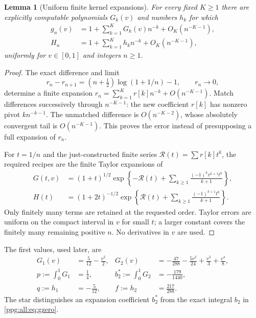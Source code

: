 \documentclass[11pt,letterpaper]{article}
\newtheorem{lemma}[theorem]{Lemma}
\theoremstyle{remark}\newtheorem{remark}[theorem]{Remark}
\numberwithin{equation}{section}
\begin{document}
\begin{lemma}[Uniform finite kernel expansions]\label{ppg:all:lem:kernel}
For every fixed $K\ge1$ there are explicitly computable polynomials $G_k(v)$ and numbers $h_k$ for which
\begin{align}
 g_n(v)&=1+\sum_{k=1}^K G_k(v)n^{-k}+O_K(n^{-K-1}),\label{ppg:all:eq:gexp}\\
 H_n&=1+\sum_{k=1}^K h_kn^{-k}+O_K(n^{-K-1}),\label{ppg:all:eq:Hexp}
\end{align}
uniformly for $v\in[0,1]$ and integers $n\ge1$.
\end{lemma}
\begin{proof}
The exact difference and limit
\[
 r_n-r_{n+1}=(n+\tfrac12)\log(1+1/n)-1,\qquad r_n\to0,
\]
determine a finite expansion $r_n=\sum_{k=1}^K r[k]n^{-k}+O(n^{-K-1})$. Match differences successively through $n^{-K-1}$: the new coefficient $r[k]$ has nonzero pivot $k n^{-k-1}$. The unmatched difference is $O(n^{-K-2})$, whose absolutely convergent tail is $O(n^{-K-1})$. This proves the error instead of presupposing a full expansion of $r_n$.

For $t=1/n$ and the just-constructed finite series $\mathcal R(t)=\sum r[k]t^k$, the required recipes are the finite Taylor expansions of
\begin{align}
 G(t,v)&=(1+t)^{1/2}\exp\left\{-\mathcal R(t)
        +\sum_{k\ge1}\frac{(-1)^kv^{k+1}t^k}{k+1}\right\},\label{ppg:all:eq:Grecipe}\\
 H(t)&=(1+2t)^{-1/2}\exp\left\{\mathcal R(t)
        +\sum_{k\ge1}\frac{(-1)^{k+1}t^k}{k+1}\right\}.\label{ppg:all:eq:Hrecipe}
\end{align}
Only finitely many terms are retained at the requested order. Taylor errors are uniform on the compact interval in $v$ for small $t$; a larger constant covers the finitely many remaining positive $n$. No derivatives in $v$ are used.
\end{proof}
The first values, used later, are
\begin{align}
 G_1(v)&=\frac5{12}-\frac{v^2}2,
 &G_2(v)&=-\frac{47}{288}-\frac{5v^2}{24}+\frac{v^3}3+\frac{v^4}8,
 \label{ppg:all:eq:G12}\\
 p:=\int_0^1G_1&=\frac14,
 &b_2^*:=\int_0^1G_2&=-\frac{179}{1440},\label{ppg:all:eq:b12}\\
 q:=h_1&=-\frac5{12},& f:=h_2&=\frac{217}{288}.
 \label{ppg:all:eq:H12}
\end{align}
The star distinguishes an expansion coefficient $b_2^*$ from the exact integral $b_2$ in \eqref{ppg:all:eq:gzero}.
\end{document}
